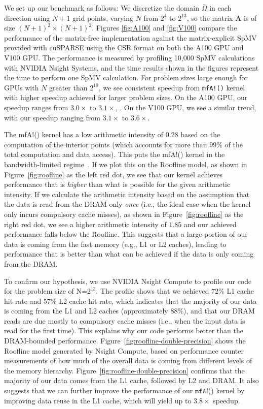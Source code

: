 We set up our benchmark as follows: We discretize the domain $\bar{\Omega}$ in each
direction using $N+1$ grid points, varying $N$ from $2^4$ to $2^{13}$, so the
matrix $\boldsymbol{A}$ is of size $(N+1)^2 \times (N+1)^2$. Figures \ref{fig:A100} and \ref{fig:V100} compare the performance of the
matrix-free implementation against the matrix-explicit SpMV provided with
cuSPARSE using the CSR format on both the A100 GPU and V100 GPU.
The performance is measured by profiling 10,000 SpMV calculations with NVIDIA Nsight Systems, and the time results shown in the figures represent the time to perform one SpMV calculation.
For problem sizes large enough for GPUs with $N$ greater than $2^{10}$, we see consistent speedup from \texttt{mfA!()} kernel with higher speedup achieved for larger problem sizes. 
On the A100 GPU, our speedup ranges from $3.0\times$ to $3.1\times$, .
On the V100 GPU, we see a similar trend, with our speedup ranging from $3.1\times$ to $3.6\times$.

The {\ttfamily mfA!}() kernel has a low arithmetic intensity of $0.28$ based on the computation of the interior points (which accounts for more than $99\%$ of the total computation and data access).
This puts the {\ttfamily mfA!}() kernel in the bandwidth-limited regime~\cite{ding2019instruction}.
If we plot this on the Roofline model, as shown in Figure~\ref{fig:roofline} as the left red dot, we see that our kernel achieves performance that is \emph{higher} than what is possible for the given arithmetic intensity.
If we calculate the arithmetic intensity based on the assumption that the data is read from the DRAM only \emph{once} (i.e., the ideal case when the kernel only incurs compulsory cache misses), as shown in Figure~\ref{fig:roofline} as the right red dot, we see a higher arithmetic intensity of $1.85$ and our achieved performance falls below the Roofline.
This suggests that a large portion of our data is coming from the fast memory (e.g., L1 or L2 caches), leading to performance that is better than what can be achieved if the data is only coming from the DRAM.

To confirm our hypothesis, we use NVIDIA Nsight Compute to profile our code for the problem size of N=$2^{13}$.
The profile shows that we achieved $72\%$ L1 cache hit rate and $57\%$ L2 cache hit rate, which indicates that the majority of our data is coming from the L1 and L2 caches (approximately $88\%$), and that our DRAM reads are due mostly to compulsory cache misses (i.e., when the input data is read for the first time).
This explains why our code performs better than the DRAM-bounded performance.
Figure~\ref{fig:roofline-double-precision} shows the Roofline model generated by Nsight Compute, based on performance counter measurements of how much of the overall data is coming from different levels of the memory hierarchy.
Figure~\ref{fig:roofline-double-precision} confirms that the majority of our data comes from the L1 cache, followed by L2 and DRAM.
It also suggests that we can further improve the performance of our $\texttt{mfA!}$() kernel by improving data reuse in the L1 cache, which will yield up to $3.8\times$ speedup.


